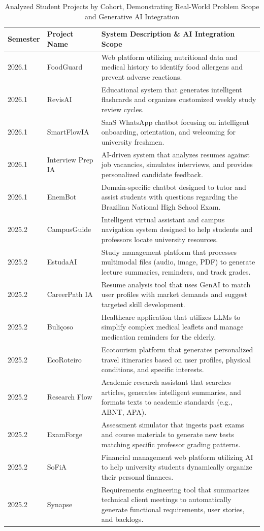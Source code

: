 \begin{table}[t]
\caption{Analyzed Student Projects by Cohort, Demonstrating Real-World Problem Scope and Generative AI Integration}
\label{tab:projects}
\centering
\begin{tabular}{@{}lp{3cm}p{12.5cm}@{}}
\toprule
\textbf{Semester} & \textbf{Project Name} & \textbf{System Description \& AI Integration Scope} \\
\midrule
2026.1 & FoodGuard & Web platform utilizing nutritional data and medical history to identify food allergens and prevent adverse reactions. \\
2026.1 & RevisAI & Educational system that generates intelligent flashcards and organizes customized weekly study review cycles. \\
2026.1 & SmartFlowIA & SaaS WhatsApp chatbot focusing on intelligent onboarding, orientation, and welcoming for university freshmen. \\
2026.1 & Interview Prep IA & AI-driven system that analyzes resumes against job vacancies, simulates interviews, and provides personalized candidate feedback. \\
2026.1 & EnemBot & Domain-specific chatbot designed to tutor and assist students with questions regarding the Brazilian National High School Exam. \\
\midrule
2025.2 & CampusGuide & Intelligent virtual assistant and campus navigation system designed to help students and professors locate university resources. \\
2025.2 & EstudaAI & Study management platform that processes multimodal files (audio, image, PDF) to generate lecture summaries, reminders, and track grades. \\
2025.2 & CareerPath IA & Resume analysis tool that uses GenAI to match user profiles with market demands and suggest targeted skill development. \\
2025.2 & Buliçoso & Healthcare application that utilizes LLMs to simplify complex medical leaflets and manage medication reminders for the elderly. \\
2025.2 & EcoRoteiro & Ecotourism platform that generates personalized travel itineraries based on user profiles, physical conditions, and specific interests. \\
2025.2 & Research Flow & Academic research assistant that searches articles, generates intelligent summaries, and formats texts to academic standards (e.g., ABNT, APA). \\
2025.2 & ExamForge & Assessment simulator that ingests past exams and course materials to generate new tests matching specific professor grading patterns. \\
2025.2 & SoFiA & Financial management web platform utilizing AI to help university students dynamically organize their personal finances. \\
2025.2 & Synapse & Requirements engineering tool that summarizes technical client meetings to automatically generate functional requirements, user stories, and backlogs. \\
\bottomrule
\end{tabular}
\end{table}
